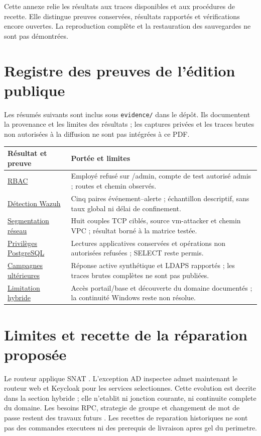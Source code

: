 \documentclass[a4paper,12pt]{report}
\begin{document}
Cette annexe relie les résultats aux traces disponibles et aux procédures de recette. Elle distingue preuves conservées, résultats rapportés et vérifications encore ouvertes. La reproduction complète et la restauration des sauvegardes ne sont pas démontrées.

\section{Registre des preuves de l'édition publique}
Les résumés suivants sont inclus sous \texttt{evidence/} dans le dépôt. Ils documentent la provenance et les limites des résultats ; les captures privées et les traces brutes non autorisées à la diffusion ne sont pas intégrées à ce PDF.
\begingroup\small\setlength{\tabcolsep}{4pt}
\begin{longtable}{@{}p{4.2cm}p{9.6cm}@{}}
\toprule Résultat et preuve & Portée et limites\\\midrule\endhead
\href{../../evidence/rbac.md}{RBAC} & Employé refusé sur /admin, compte de test autorisé admis ; routes et chemin observés.\\
\href{../../evidence/wazuh.md}{Détection Wazuh} & Cinq paires événement--alerte ; échantillon descriptif, sans taux global ni délai de confinement.\\
\href{../../evidence/network.md}{Segmentation réseau} & Huit couples TCP ciblés, source vm-attacker et chemin VPC ; résultat borné à la matrice testée.\\
\href{../../evidence/database.md}{Privilèges PostgreSQL} & Lectures applicatives conservées et opérations non autorisées refusées ; SELECT reste permis.\\
\href{../../evidence/later-campaigns.md}{Campagnes ultérieures} & Réponse active synthétique et LDAPS rapportés ; les traces brutes complètes ne sont pas publiées.\\
\href{../../evidence/hybrid.md}{Limitation hybride} & Accès portail/base et découverte du domaine documentés ; la continuité Windows reste non résolue.\\
\bottomrule
\end{longtable}\endgroup

\section{Limites et recette de la réparation proposée}
Le routeur applique SNAT \cite{tssnat}. L'exception AD inspectee admet maintenant le routeur web et Keycloak pour les services selectionnes. Cette evolution est decrite dans la section hybride ; elle n'etablit ni jonction courante, ni continuite complete du domaine. Les besoins RPC, strategie de groupe et changement de mot de passe restent des travaux futurs \cite{adfirewall}. Les recettes de reparation historiques ne sont pas des commandes executees ni des prerequis de livraison apres gel du perimetre.
\end{document}
